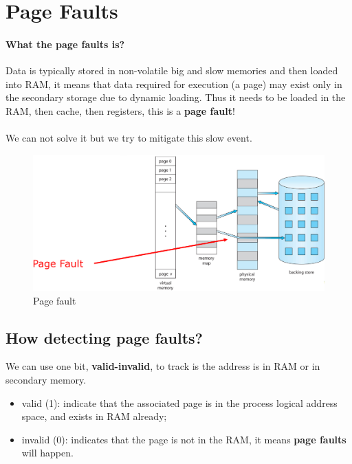 \newpage
\section{Page Faults}

\paragraph{What the page faults is?} Data is typically stored in non-volatile big and slow memories and then loaded into RAM, it means that data required for execution (a page) may exist only in the secondary storage due to dynamic loading. Thus it needs to be loaded in the RAM, then cache, then registers, this is a \textbf{page fault}!

\paragraph{}
We can not solve it but we try to mitigate this slow event.

\begin{figure}[htbp]
    \centering
    \includegraphics[width=0.75\linewidth]{img/frsb.png}
    \caption{Page fault}
\end{figure}

\subsection{How detecting page faults?}

We can use one bit, \textbf{valid-invalid}, to track is the address is in RAM or in secondary memory.

\begin{itemize}
    \item valid (1): indicate that the associated page is in the process logical address space, and exists in RAM already;
    \item invalid (0): indicates that the page is not in the RAM, it means \textbf{page faults} will happen.
\end{itemize}


